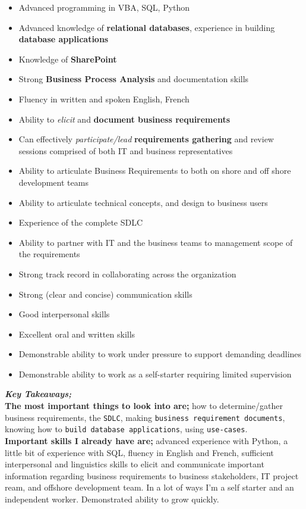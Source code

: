 \documentclass{article}
\begin{document}
\begin{itemize}
    \item Advanced programming in VBA, SQL, Python
    \item Advanced knowledge of \textbf{relational databases}, experience in building \textbf{database applications}
    \item Knowledge of \textbf{SharePoint}
    \item Strong \textbf{Business Process Analysis} and documentation skills
    \item Fluency in written and spoken English, French
    \item Ability to \textit{elicit} and \textbf{document business requirements}
    \item Can effectively \textit{participate/lead} \textbf{requirements gathering} and review sessions comprised of both IT and business representatives
    \item Ability to articulate Business Requirements to both on shore and off shore development teams
    \item Ability to articulate technical concepts, and design to business users
    \item Experience of the complete SDLC 
    \item Ability to partner with IT and the business teams to management scope of the requirements
    \item Strong track record in collaborating across the organization
    \item Strong (clear and concise) communication skills
    \item Good interpersonal skills
    \item Excellent oral and written skills
    \item Demonstrable ability to work under pressure to support demanding deadlines
    \item Demonstrable ability to work as a self-starter requiring limited supervision
\end{itemize}

\textit{\textbf{Key Takeaways;}} \\

\textbf{The most important things to look into are;} how to determine/gather business requirements, the \texttt{SDLC}, making \texttt{business requirement documents}, knowing how to \texttt{build database applications}, using \texttt{use-cases}. \\

\textbf{Important skills I already have are;} advanced experience with Python, a little bit of experience with SQL, fluency in English and French, sufficient interpersonal and linguistics skills to elicit and communicate important information regarding business requirements to business stakeholders, IT project ream, and offshore development team. In a lot of ways I'm a self starter and an independent worker. Demonstrated ability to grow quickly. 
\end{document}
